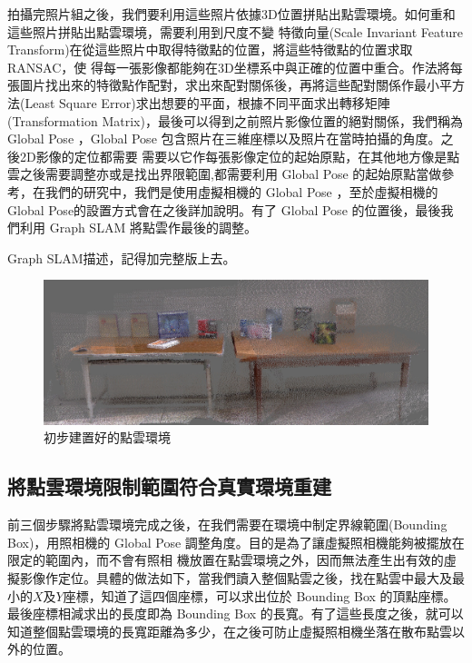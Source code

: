      
    拍攝完照片組之後，我們要利用這些照片依據3D位置拼貼出點雲環境。如何重和這些照片拼貼出點雲環境，需要利用到尺度不變
特徵向量(Scale Invariant Feature Transform)在從這些照片中取得特徵點的位置，將這些特徵點的位置求取RANSAC，使
得每一張影像都能夠在3D坐標系中與正確的位置中重合。作法將每張圖片找出來的特徵點作配對，求出來配對關係後，再將這些配對關係作最小平方法(Least Square Error)求出想要的平面，根據不同平面求出轉移矩陣
     (Transformation Matrix)，最後可以得到之前照片影像位置的絕對關係，我們稱為 Global Pose ，Global Pose 包含照片在三維座標以及照片在當時拍攝的角度。之後2D影像的定位都需要
    需要以它作每張影像定位的起始原點，在其他地方像是點雲之後需要調整亦或是找出界限範圍,都需要利用 Global Pose 的起始原點當做參考，在我們的研究中，我們是使用虛擬相機的
     Global Pose ，至於虛擬相機的 Global Pose的設置方式會在之後詳加說明。有了 Global Pose 的位置後，最後我們利用 Graph SLAM 將點雲作最後的調整。
   
    Graph SLAM描述，記得加完整版上去。     
          

\begin{figure}
  \includegraphics[width=\textwidth]{figures/3DPoint_Cloud_Map.jpg}
  \caption{初步建置好的點雲環境}
  \label{fig:Point Cloud Map}
\end{figure}


\subsection{將點雲環境限制範圍符合真實環境重建}
     
%     
    前三個步驟將點雲環境完成之後，在我們需要在環境中制定界線範圍(Bounding Box)，用照相機的 Global Pose 調整角度。目的是為了讓虛擬照相機能夠被擺放在限定的範圍內，而不會有照相
    機放置在點雲環境之外，因而無法產生出有效的虛擬影像作定位。具體的做法如下，當我們讀入整個點雲之後，找在點雲中最大及最小的$X$及$Y$座標，知道了這四個座標，可以求出位於 Bounding
     Box 的頂點座標。最後座標相減求出的長度即為 Bounding Box 的長寬。有了這些長度之後，就可以知道整個點雲環境的長寬距離為多少，在之後可防止虛擬照相機坐落在散布點雲以外的位置。

